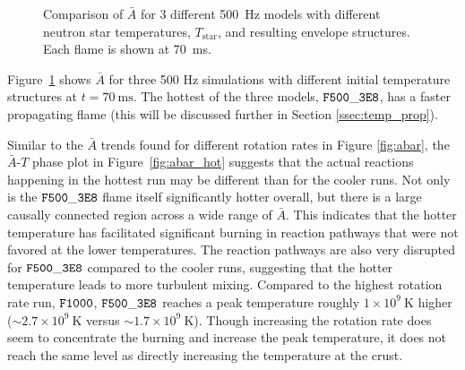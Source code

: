 \documentclass[preprint,times,tighten]{aastex63}
\begin{document}
\begin{figure}[t]
\centering
{}
\caption{\label{fig:compare_500Hz_abar} Comparison of $\bar{A}$ for 3 different 500~Hz models with different neutron star temperatures, $T_\mathrm{star}$, and resulting envelope structures.  Each flame is shown at 70~ms.} 
\end{figure}

Figure~\ref{fig:compare_500Hz_abar} shows $\bar{A}$ for three 500 Hz simulations with different initial temperature structures at $t = 70~\mathrm{ms}$. The hottest of the three models, $\tt{F500\_3E8}$, has a faster propagating flame (this will be discussed further in Section \ref{ssec:temp_prop}).  

Similar to the $\bar{A}$ trends found for different rotation rates in Figure \ref{fig:abar}, the $\bar{A}$-$T$ phase plot in Figure~\ref{fig:abar_hot} suggests that the actual reactions happening in the hottest run may be different than for the cooler runs. Not only is the $\tt{F500\_3E8}$ flame itself significantly hotter overall, but there is a large causally connected region across a wide range of $\bar{A}$. This indicates that the hotter temperature has facilitated significant burning in reaction pathways that were not favored at the lower temperatures. The reaction pathways are also very disrupted for $\tt{F500\_3E8}$ compared to the cooler runs, suggesting that the hotter temperature leads to more turbulent mixing. Compared to the highest rotation rate run, $\tt{F1000}$, $\tt{F500\_3E8}$ reaches a peak temperature roughly $1 \times 10^9~\mathrm{K}$ higher ($\sim 2.7 \times 10^9~\mathrm{K}$ versus $\sim 1.7 \times 10^9~\mathrm{K}$). Though increasing the rotation rate does seem to concentrate the burning and increase the peak temperature, it does not reach the same level as directly increasing the temperature at the crust.
\end{document}
